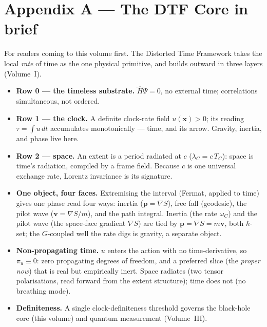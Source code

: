 \documentclass[11pt]{article}
\begin{document}
\appendix
\section*{Appendix A --- The DTF Core in brief}
\noindent For readers coming to this volume first. The Distorted Time Framework takes the local
\emph{rate} of time as the one physical primitive, and builds outward in three layers (Volume~I).
\begin{itemize}[leftmargin=1.4em,itemsep=3pt,topsep=3pt]
  \item \textbf{Row 0 --- the timeless substrate.} $\hat H\Psi=0$, no external time; correlations
    simultaneous, not ordered.
  \item \textbf{Row 1 --- the clock.} A definite clock-rate field $u(\mathbf x)>0$; its reading
    $\tau=\int u\,dt$ accumulates monotonically --- time, and its arrow. Gravity, inertia, and phase live
    here.
  \item \textbf{Row 2 --- space.} An extent is a period radiated at $c$ ($\lambda_C=c\,T_C$): space is
    time's radiation, compiled by a frame field. Because $c$ is one universal exchange rate, Lorentz
    invariance is its signature.
  \item \textbf{One object, four faces.} Extremising the interval (Fermat, applied to time) gives one
    phase read four ways: inertia ($\mathbf p=\nabla S$), free fall (geodesic), the pilot wave
    ($\mathbf v=\nabla S/m$), and the path integral. Inertia (the rate $\omega_C$) and the pilot wave (the
    space-face gradient $\nabla S$) are tied by $\mathbf p=\nabla S=m\mathbf v$, both $\hbar$-set; the
    $G$-coupled well the rate digs is gravity, a separate object.
  \item \textbf{Non-propagating time.} $u$ enters the action with no time-derivative, so $\pi_u\equiv0$:
    zero propagating degrees of freedom, and a preferred slice (the \emph{proper now}) that is real but
    empirically inert. Space radiates (two tensor polarisations, read forward from the extent structure); time does not (no breathing mode).
  \item \textbf{Definiteness.} A single clock-definiteness threshold governs the black-hole core (this
    volume) and quantum measurement (Volume~III).
\end{itemize}
\end{document}
